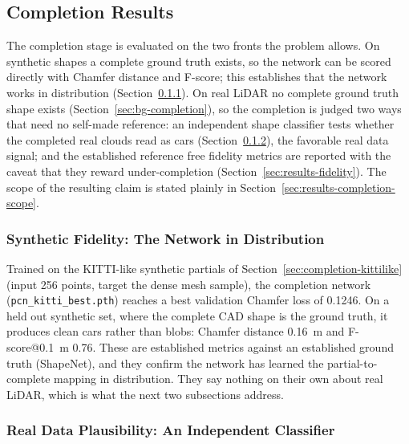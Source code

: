\documentclass[a4paper,12pt]{report}
\begin{document}
\subsection{Completion Results}
\label{sec:results-completion}
\label{sec:completion-results}

The completion stage is evaluated on the two fronts the problem allows. On
synthetic shapes a complete ground truth exists, so the network can be scored
directly with Chamfer distance and F-score; this establishes that the network works in
distribution (Section~\ref{sec:results-synthetic}). On real LiDAR no complete
ground truth shape exists (Section~\ref{sec:bg-completion}), so the completion is judged
two ways that need no self-made reference: an independent shape classifier tests whether
the completed real clouds read as cars (Section~\ref{sec:results-plausibility}), the
favorable real data signal; and the established reference free fidelity metrics are
reported with the caveat that they reward under-completion
(Section~\ref{sec:results-fidelity}). The scope of the resulting claim is stated plainly in
Section~\ref{sec:results-completion-scope}.

\subsubsection{Synthetic Fidelity: The Network in Distribution}
\label{sec:results-synthetic}

Trained on the KITTI-like synthetic partials of Section~\ref{sec:completion-kittilike}
(input \num{256} points, target the dense mesh sample), the completion network
(\texttt{pcn\_kitti\_best.pth}) reaches a best validation Chamfer loss of \num{0.1246}. On
a held out synthetic set, where the complete CAD shape is the ground truth, it produces
clean cars rather than blobs: Chamfer distance \SI{0.16}{\meter} and
F-score@\SI{0.1}{\meter} \num{0.76}. These are established metrics against an established
ground truth (ShapeNet), and they confirm the network has learned the partial-to-complete
mapping in distribution. They say nothing on their own about real LiDAR, which is what the
next two subsections address.

\subsubsection{Real Data Plausibility: An Independent Classifier}
\label{sec:results-plausibility}
\end{document}

